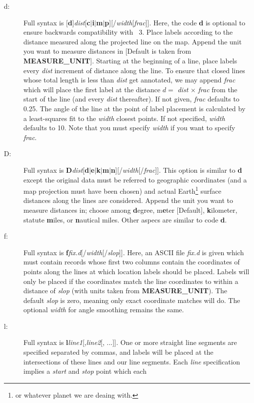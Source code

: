 \begin{description}
\item [d:] Full syntax is [{\bf d}]{\it dist}[{\bf c$|$i$|$m$|$p}][/{\it width}[{\it frac}]].
Here, the code {\bf d} is optional to ensure backwards compatibility with \GMT\ 3.
Place labels according to the distance measured along the projected line on the map.  Append the
unit you want to measure distances in [Default is taken from {\bf MEASURE\_UNIT}].
Starting at the beginning of a line, place labels every {\it dist} increment of
distance along the line.  To ensure that closed lines whose total length is less
than {\it dist} get annotated, we may append {\it frac} which will place the first
label at the distance $d =$ {\it dist} $\times$ {\it frac} from the start of the
line (and every {\it dist} thereafter).  If not given, {\it frac} defaults to 0.25.
The angle of the line at the point of label placement is calculated by a least-squares
fit to the {\it width} closest points.  If not specified, {\it width} defaults to 10.
Note that you must specify {\it width} if you want to specify {\it frac}.
\item [D:] Full syntax is {\bf D}{\it dist}[{\bf d$|$e$|$k$|$m$|$n}][/{\it width}[/{\it frac}]].
This option is similar to {\bf d} except the original data must be referred to geographic
coordinates (and a map projection must have been chosen) and actual Earth\footnote{or whatever
planet we are deaing with.} surface distances along the lines are considered.  Append the
unit you want to measure distances in; choose among {\bf d}egree, m{\bf e}ter [Default],
{\bf k}ilometer, statute {\bf m}iles, or {\bf n}autical miles.  Other aspecs are similar to code {\bf d}.
\item [f:] Full syntax is {\bf f}{\it fix.d}[/{\it width}[/{\it slop}]].  Here, an ASCII file {\it fix.d} is
given which must contain records whose first two columns contain the coordinates of points along
the lines at which location labels should be placed.  Labels will only be placed if the coordinates
match the line coordinates to within a distance of {\it slop} (with units taken from {\bf MEASURE\_UNIT}).
The default {\it slop} is zero, meaning only exact coordinate matches will do.  The optional {\it width}
for angle smoothing remains the same.
\item [l:] Full syntax is {\bf l}{\it line1}[,{\it line2}[, ...]].  One or more straight line segments
are specified separated by commas, and labels will be placed at the intersections of these lines and
our line segments.  Each {\it line} specification implies a {\it start} and {\it stop} point which each

\end{description}
